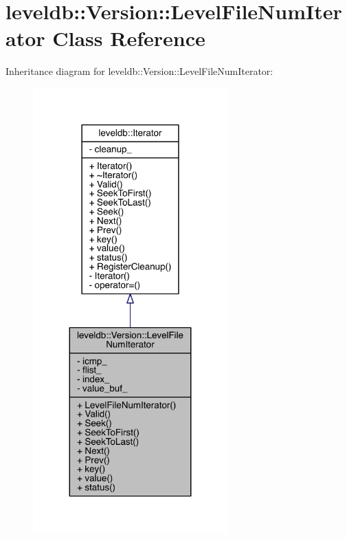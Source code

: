 \hypertarget{classleveldb_1_1_version_1_1_level_file_num_iterator}{}\section{leveldb\+:\+:Version\+:\+:Level\+File\+Num\+Iterator Class Reference}
\label{classleveldb_1_1_version_1_1_level_file_num_iterator}


Inheritance diagram for leveldb\+:\+:Version\+:\+:Level\+File\+Num\+Iterator\+:\nopagebreak
\begin{figure}[H]
\begin{center}
\leavevmode
\includegraphics[width=212pt]{classleveldb_1_1_version_1_1_level_file_num_iterator__inherit__graph}
\end{center}
\end{figure}


